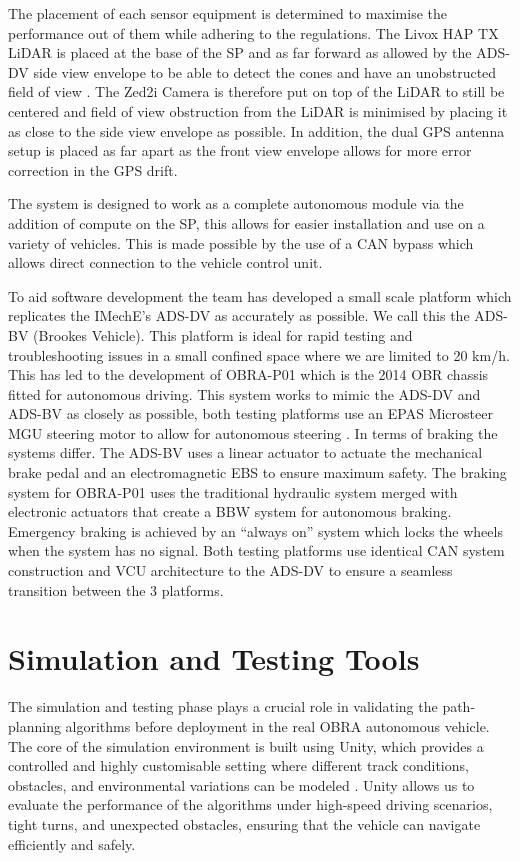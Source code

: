 \documentclass[a4paper,11pt]{report}
\begin{document}
The placement of each sensor equipment is determined to maximise the performance out of them while adhering 
to the regulations. The Livox HAP TX LiDAR is placed at the base of the SP and as far forward as allowed by the 
ADS-DV side view envelope to be able to detect the cones and have an unobstructed field of view \cite{reference27}. The Zed2i Camera 
is therefore put on top of the LiDAR to still be centered and field of view obstruction from the LiDAR is 
minimised by placing it as close to the side view envelope as possible. In addition, the dual GPS antenna setup 
is placed as far apart as the front view envelope allows for more error correction in the GPS drift.

The system is designed to work as a complete autonomous module via the addition of compute on the SP, 
this allows for easier installation and use on a variety of vehicles. This is made possible by the use of 
a CAN bypass which allows direct connection to the vehicle control unit.

To aid software development the team has developed a small scale platform which replicates the IMechE’s 
ADS-DV as accurately as possible. We call this the ADS-BV (Brookes Vehicle). This platform is ideal for rapid 
testing and troubleshooting issues in a small confined space where we are limited to 20 km/h. This has led to 
the development of OBRA-P01 which is the 2014 OBR chassis fitted for autonomous driving. This system works to mimic 
the ADS-DV and ADS-BV as closely as possible, both testing platforms use an EPAS Microsteer MGU steering motor to allow 
for autonomous steering \cite{reference28}. In terms of braking the systems differ. The ADS-BV uses a linear actuator to actuate the 
mechanical brake pedal and an electromagnetic EBS to ensure maximum safety. The braking system for OBRA-P01 uses the 
traditional hydraulic system merged with electronic actuators that create a BBW system for autonomous braking. Emergency 
braking is achieved by an “always on” system which locks the wheels when the system has no signal. Both testing platforms 
use identical CAN system construction and VCU architecture to the ADS-DV to ensure a seamless transition between the 3 platforms.


\section{Simulation and Testing Tools}

The simulation and testing phase plays a crucial role in validating the path-planning 
algorithms before deployment in the real OBRA autonomous vehicle. The core of the simulation 
environment is built using Unity, which provides a controlled and highly customisable setting 
where different track conditions, obstacles, and environmental variations can be modeled \cite{reference17}. Unity 
allows us to evaluate the performance of the algorithms under high-speed driving scenarios, tight turns, 
and unexpected obstacles, ensuring that the vehicle can navigate efficiently and safely.
\end{document}
